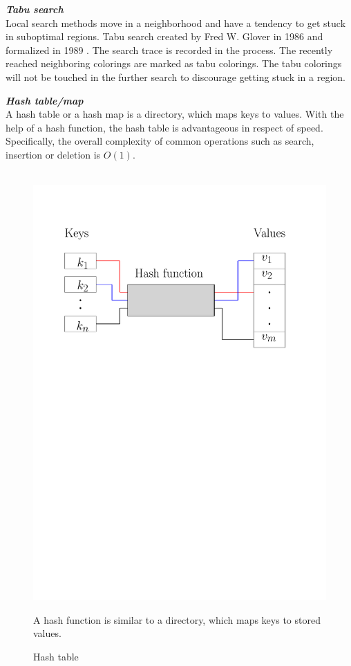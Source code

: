 \documentclass[12pt,a4paper,twoside]{scrartcl}
\numberwithin{equation}{section}
\begin{document}
\emph{\textbf{Tabu search}}\\
Local search methods move in a neighborhood and have a tendency to get stuck in suboptimal regions. Tabu search created by Fred W. Glover in 1986 \cite{glover1986future} and formalized in 1989 \cite{glover1989tabu1}\cite{glover1990tabu2}.
The search trace is recorded in the process. The recently reached neighboring colorings are marked as tabu colorings. The tabu colorings will not be touched in the further search to discourage getting stuck in a region.

\emph{\textbf{Hash table/map}} \cite{cormen2009introduction}\\
A hash table or a hash map is a directory, which maps keys to values. With the help of a hash function, the hash table is advantageous in respect of speed. Specifically, the overall complexity of common operations such as search, insertion or deletion is $O (1)$.


\begin{figure}[h]
\centering
 \hbox{\hspace{12em} \includegraphics[scale = 0.6]{1/hashTable.pdf}}
 \caption{Hash table}
 A hash function is similar to a directory, which maps keys to stored values.
\end{figure}
\end{document}
